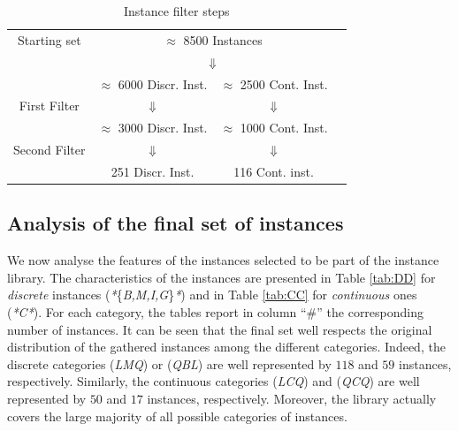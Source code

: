 \begin{table}
 \centering
 \setlength{\tabcolsep}{5pt}
\begin{tabular}{cccc}
Starting set& \multicolumn{ 2}{c}{ $\approx$ 8500 Instances }& \\
& \multicolumn{ 2}{c}{$\Downarrow$}& \\
& $\approx$ 6000 Discr. Inst.  & $\approx$ 2500 Cont. Inst. & \\
First Filter  & $\Downarrow$  & $\Downarrow$ & \\
 & $\approx$ 3000 Discr. Inst.  & $\approx$ 1000 Cont. Inst. & \\
Second Filter & $\Downarrow$  & $\Downarrow$  & \\
  & 251 Discr. Inst.  & 116  Cont. inst. & \\
\end{tabular}
\caption{Instance filter steps} \label{tab:filters}
\end{table}

\subsection{Analysis of the final set of instances}\label{subsec:final set}

We now analyse the features of the instances selected to be part of the
instance library. The characteristics of the instances are presented in Table
\ref{tab:DD} for \emph{discrete} instances
(\textit{*}\{\textit{B,M,I,G}\}\textit{*}) and in Table
\ref{tab:CC} for \emph{continuous} ones (\textit{*C*}).
For each category, the tables
report in column ``$\#$'' the corresponding number of instances. It can be seen
that the final set well respects the original distribution of the gathered
instances among the different categories. Indeed, the discrete categories
(\textit{LMQ}) or (\textit{QBL}) are well represented by $118$ and $59$
instances, respectively. Similarly, the continuous categories
(\textit{LCQ}) and (\textit{QCQ}) are well
represented by $50$ and $17$ instances, respectively. Moreover, the library
actually covers the large majority of all possible categories of instances.

